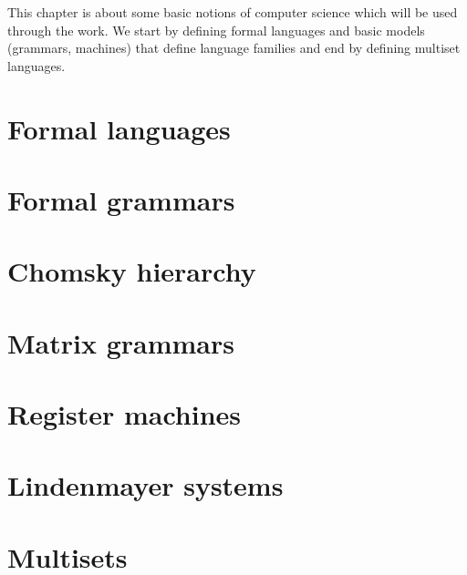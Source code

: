 This chapter is about some basic notions of computer science which will be used through the work. We start by defining formal languages and basic models (grammars, machines) that define language families and end by defining multiset languages.

\section{Formal languages} %
\label{sec:formal_languages}



\section{Formal grammars} %
\label{sec:formal_grammars}



\section{Chomsky hierarchy} %
\label{sec:chomsky_hierarchy}



\section{Matrix grammars} %
\label{sec:matrix_grammars}



\section{Register machines} %
\label{sec:register_machines}



\section{Lindenmayer systems} %
\label{sec:lindenmayer_systems}



\section{Multisets} %
\label{sec:multisets}


